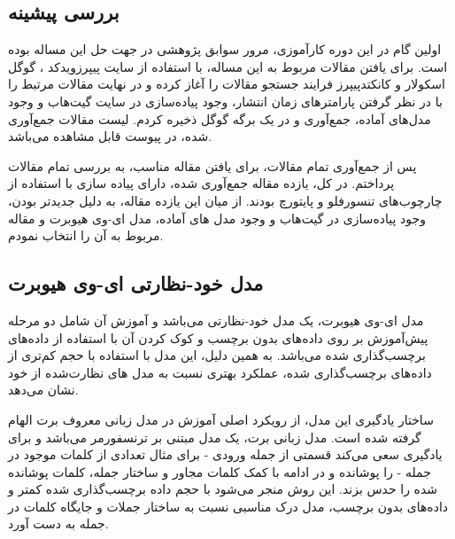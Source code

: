 \subsection{بررسی پیشینه}

اولین گام در این دوره کارآموزی، مرور سوابق پژوهشی در جهت حل این مساله بوده است. برای یافتن مقالات مربوط به این مساله، با استفاده از سایت پیپرزویدکد
، گوگل اسکولار
و کانکتدپیپرز
فرایند جستجو مقالات را آغاز کرده و در نهایت مقالات مرتبط را با در نظر گرفتن پارامتر‌های زمان انتشار، وجود پیاده‌سازی در سایت گیت‌هاب
 و وجود مدل‌های آماده، جمع‌آوری و در یک برگه گوگل ذخیره کردم. لیست مقالات جمع‌آوری شده، در پیوست قابل مشاهده می‌باشد. %
 
پس از جمع‌آوری تمام مقالات، برای یافتن مقاله مناسب، به بررسی تمام مقالات پرداختم. در کل، یازده مقاله جمع‌آوری شده، دارای پیاده سازی با استفاده از چارچوب‌های
 تنسورفلو
و پایتورچ
بودند. از میان این یازده مقاله، به دلیل جدیدتر بودن، وجود پیاده‌سازی در گیت‌هاب و وجود مدل های آماده، مدل ای-وی هیوبرت
 و مقاله مربوط به آن
را انتخاب نمودم.

\subsection{مدل خود-نظارتی ای-وی هیوبرت}

مدل ای-وی هیوبرت، یک مدل خود-نظارتی
می‌باشد و آموزش آن شامل دو مرحله پیش‌آموزش بر روی داده‌های بدون برچسب و کوک کردن آن با استفاده از داده‌های برچسب‌گذاری شده می‌باشد. به همین دلیل، این مدل با استفاده با حجم کم‌تری از داده‌های برچسب‌گذاری شده، عملکرد بهتری نسبت به مدل های نظارت‌شده
 از خود نشان می‌دهد.

ساختار یادگیری این مدل، از رویکرد اصلی آموزش در مدل زبانی معروف برت
 الهام گرفته شده است. مدل زبانی برت، یک مدل مبتنی بر ترنسفورمر
  می‌باشد و برای یادگیری سعی می‌کند قسمتی از جمله ورودی - برای مثال تعدادی از کلمات موجود در جمله - را پوشانده و در ادامه با کمک کلمات مجاور و ساختار جمله، کلمات پوشانده شده را حدس بزند. این روش منجر می‌شود با حجم داده برچسب‌گذاری شده کمتر و داده‌های بدون برچسب، مدل درک مناسبی نسبت به ساختار جملات و جایگاه کلمات در جمله به دست آورد. 

